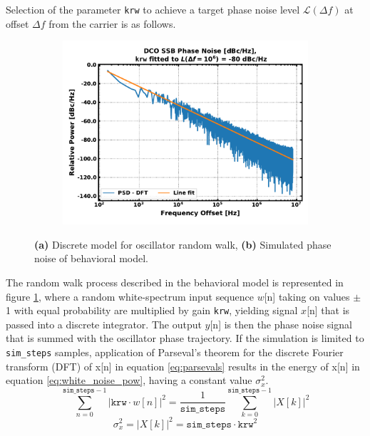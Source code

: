Selection of the parameter \texttt{krw} to achieve a target phase noise level $\mathcal{L}(\Delta f)$ at offset $\Delta f$ from the carrier is as follows.
	\begin{figure}[htb!]
	    \centering
	    \begin{subfigure}{0.45\textwidth}
	        \centering
			
			\caption{ }
			\label{fig:rw_pn}
	    \end{subfigure}
	    \begin{subfigure}{0.5\textwidth}
	        \centering\includegraphics[width=1.0\textwidth, angle=0]{figs/dco_rw_pn.pdf}
			\caption{ }
			\label{fig:dco_rw_pn_sim}
	    \end{subfigure}%
	    \label{fig:dco_rw_model}
	    \caption{\textbf{(a)} Discrete model for oscillator random walk, \textbf{(b)} Simulated phase noise of behavioral model.}
	\end{figure}
	\FloatBarrier
The random walk process described in the behavioral model is represented in figure \ref{fig:rw_pn}, where a random white-spectrum input sequence $w$[n] taking on values $\pm$ 1 with equal probability are multiplied by gain \texttt{krw}, yielding signal $x$[n] that is passed into a discrete integrator. The output $y$[n] is then the phase noise signal that is summed with the oscillator phase trajectory. If the simulation is limited to \texttt{sim\_steps} samples, application of Parseval's theorem for the discrete Fourier transform (DFT) of x[n] in equation \ref{eq:parsevals} results in the energy of x[n] in equation \ref{eq:white_noise_pow}, having a constant value $\sigma_x^2$.
\begin{equation}\label{eq:parsevals}
\sum _{n=0}^{\mathtt{sim\_steps}-1}|\texttt{krw}\cdot w[n]|^{2}=\frac{1}{\mathtt{sim\_steps}}\sum _{k=0}^{\mathtt{sim\_steps}-1}| X[k]|^{2}
\end{equation}
\begin{equation}\label{eq:white_noise_pow}
\sigma_x^2 = |X[k]|^{2} =\mathtt{sim\_steps}\cdot\texttt{krw}^2
\end{equation}

